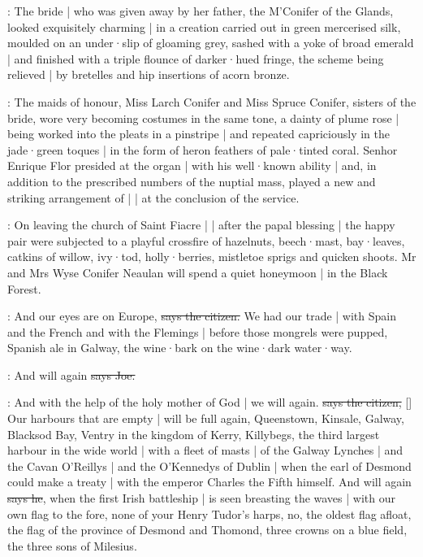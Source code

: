 :
The bride |
who was given away by her father,
the M'Conifer of the Glands,
looked exquisitely charming |
in a creation carried out in green mercerised silk,
moulded on an under·slip of gloaming grey,
sashed with a yoke of broad emerald |
and finished with a triple flounce of darker·hued fringe,
the scheme being relieved |
by bretelles and hip insertions of acorn bronze.

:
The maids of honour,
Miss Larch Conifer and Miss Spruce Conifer,
sisters of the bride,
wore very becoming costumes in the same tone,
a dainty  of plume rose |
being worked into the pleats in a pinstripe |
and repeated capriciously in the jade·green toques |
in the form of heron feathers of pale·tinted coral.
Senhor Enrique Flor presided at the organ |
with his well·known ability |
and,
in addition to the prescribed numbers of the nuptial mass,
played a new and striking arrangement of
 |
 |
at the conclusion of the service.

:
On leaving the church of Saint Fiacre |
 |
after the papal blessing |
the happy pair were subjected to a playful crossfire of hazelnuts,
beech·mast,
bay·leaves,
catkins of willow,
ivy·tod,
holly·berries,
mistletoe sprigs
and quicken shoots.
Mr and Mrs Wyse Conifer Neaulan will spend a quiet honeymoon |
in the Black Forest.

\citizen:
And our eyes are on Europe,
\sout{says the citizen.}
We had our trade |
with Spain and the French and with the Flemings |
before those mongrels were pupped,
Spanish ale in Galway,
the wine·bark on the wine·dark water·way.

\joe:
And will again
\sout{says Joe.}

\citizen:
And with the help of the holy mother of God |
we will again.
\sout{says the citizen,}
[]
Our harbours that are empty |
will be full again,
Queenstown,
Kinsale,
Galway,
Blacksod Bay,
Ventry in the kingdom of Kerry,
Killybegs,
the third largest harbour in the wide world |
with a fleet of masts |
of the Galway Lynches |
and the Cavan O'Reillys |
and the O'Kennedys of Dublin |
when the earl of Desmond
could make a treaty |
with the emperor Charles the Fifth himself.
And will again
\sout{says he},
when the first Irish battleship |
is seen breasting the waves |
with our own flag to the fore,
none of your Henry Tudor's harps,
no,
the oldest flag afloat,
the flag of the province of Desmond and Thomond,
three crowns on a blue field,
the three sons of Milesius.%

